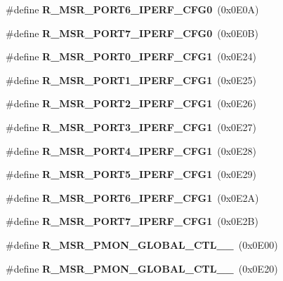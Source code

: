 \begin{DoxyCompactItemize}
\item 
\mbox{\label{types_8h_a02ac6e4efb4adbb600d19ad98d84046b}} 
\#define {\bfseries R\+\_\+\+M\+S\+R\+\_\+\+P\+O\+R\+T6\+\_\+\+I\+P\+E\+R\+F\+\_\+\+C\+F\+G0}~(0x0\+E0\+A)
\item 
\mbox{\label{types_8h_a05482e85080156c7a265712e73995b37}} 
\#define {\bfseries R\+\_\+\+M\+S\+R\+\_\+\+P\+O\+R\+T7\+\_\+\+I\+P\+E\+R\+F\+\_\+\+C\+F\+G0}~(0x0\+E0\+B)
\item 
\mbox{\label{types_8h_a7c7005e95afe6bdd361e8ade30627387}} 
\#define {\bfseries R\+\_\+\+M\+S\+R\+\_\+\+P\+O\+R\+T0\+\_\+\+I\+P\+E\+R\+F\+\_\+\+C\+F\+G1}~(0x0\+E24)
\item 
\mbox{\label{types_8h_a4c47a3f8aa06e7d10f841b78fde05113}} 
\#define {\bfseries R\+\_\+\+M\+S\+R\+\_\+\+P\+O\+R\+T1\+\_\+\+I\+P\+E\+R\+F\+\_\+\+C\+F\+G1}~(0x0\+E25)
\item 
\mbox{\label{types_8h_a98c0c5acc29e6147895d11f6bb4de11e}} 
\#define {\bfseries R\+\_\+\+M\+S\+R\+\_\+\+P\+O\+R\+T2\+\_\+\+I\+P\+E\+R\+F\+\_\+\+C\+F\+G1}~(0x0\+E26)
\item 
\mbox{\label{types_8h_abebfaa2fde6310a3ce85e0e0311bb97d}} 
\#define {\bfseries R\+\_\+\+M\+S\+R\+\_\+\+P\+O\+R\+T3\+\_\+\+I\+P\+E\+R\+F\+\_\+\+C\+F\+G1}~(0x0\+E27)
\item 
\mbox{\label{types_8h_acdcb6fc1a7d8ad0aeac8d24a72a3b741}} 
\#define {\bfseries R\+\_\+\+M\+S\+R\+\_\+\+P\+O\+R\+T4\+\_\+\+I\+P\+E\+R\+F\+\_\+\+C\+F\+G1}~(0x0\+E28)
\item 
\mbox{\label{types_8h_a6e177e80a2f158692aed8377762e9f94}} 
\#define {\bfseries R\+\_\+\+M\+S\+R\+\_\+\+P\+O\+R\+T5\+\_\+\+I\+P\+E\+R\+F\+\_\+\+C\+F\+G1}~(0x0\+E29)
\item 
\mbox{\label{types_8h_a4d55e2f6de902b882eab96099404942b}} 
\#define {\bfseries R\+\_\+\+M\+S\+R\+\_\+\+P\+O\+R\+T6\+\_\+\+I\+P\+E\+R\+F\+\_\+\+C\+F\+G1}~(0x0\+E2\+A)
\item 
\mbox{\label{types_8h_acdcb1863d1298052b1308036f9148120}} 
\#define {\bfseries R\+\_\+\+M\+S\+R\+\_\+\+P\+O\+R\+T7\+\_\+\+I\+P\+E\+R\+F\+\_\+\+C\+F\+G1}~(0x0\+E2\+B)
\item 
\mbox{\label{types_8h_ae49dab540a902aafc528ed8a3a21374b}} 
\#define {\bfseries R\+\_\+\+M\+S\+R\+\_\+\+P\+M\+O\+N\+\_\+\+G\+L\+O\+B\+A\+L\+\_\+\+C\+T\+L\+\_\+\_}~(0x0\+E00)
\item 
\mbox{\label{types_8h_a7a9abbcc666865f1760875f7d61cc798}} 
\#define {\bfseries R\+\_\+\+M\+S\+R\+\_\+\+P\+M\+O\+N\+\_\+\+G\+L\+O\+B\+A\+L\+\_\+\+C\+T\+L\+\_\+\_}~(0x0\+E20)
\item 

\end{DoxyCompactItemize}
